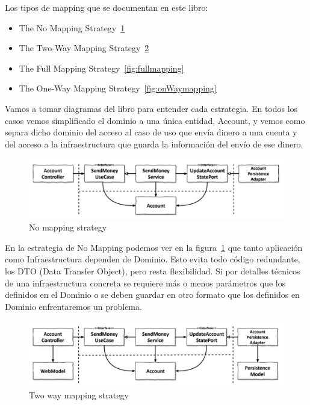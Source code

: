 Los tipos de mapping que se documentan en este libro\cite{TomHombergs2019GYHD}:
\begin{itemize}
    \item The No Mapping Strategy~\cref{fig:nomapping}
    \item The Two-Way Mapping Strategy~\cref{fig:twowaymapping}
    \item The Full Mapping Strategy~\cref{fig:fullmapping}
    \item The One-Way Mapping Strategy~\cref{fig:onWaymapping}
\end{itemize}

Vamos a tomar diagramas del libro para entender cada estrategia. En todos los casos vemos simplificado el dominio a una única entidad, Account, y vemos como separa dicho dominio del acceso al caso de uso que envía dinero a una cuenta y del acceso a la infraestructura que guarda la información del envío de ese dinero.

\begin{figure}[H]
    \centering
    \includegraphics[height=0.1\textheight]{./part/Ejecucion/Seguimiento/CreateTaskUseCase/img/nomapping}
    \caption{No mapping strategy~\cite{TomHombergs2019GYHD}}\label{fig:nomapping}
\end{figure}

En la estrategia de No Mapping podemos ver en la figura~\cref{fig:nomapping} que tanto aplicación como Infraestructura dependen de Dominio. Esto evita todo código redundante, los \gls{DTO} (Data Transfer Object), pero resta flexibilidad. Si por detalles técnicos de una infraestructura concreta se requiere más o menos parámetros que los definidos en el Dominio o se deben guardar en otro formato que los definidos en Dominio enfrentaremos un problema.

\begin{figure}[H]
    \centering
    \includegraphics[height=0.1\textheight]{./part/Ejecucion/Seguimiento/CreateTaskUseCase/img/twowaymapping}
    \caption{Two way mapping strategy~\cite{TomHombergs2019GYHD}}\label{fig:twowaymapping}
\end{figure}

